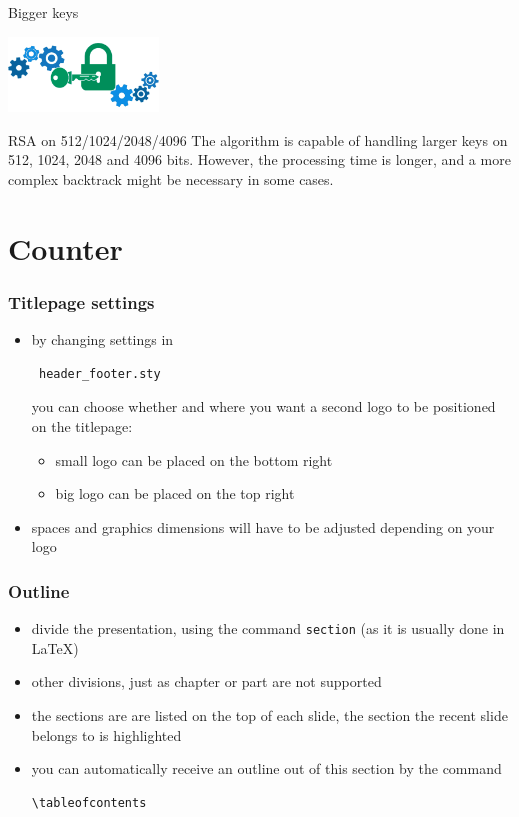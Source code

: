 \documentclass{beamer}
\begin{document}
\begin{frame}{Bigger keys}
  \begin{center}
    \includegraphics[width=4cm]{./graphics/key}
  \end{center}
  \begin{block}{RSA on 512/1024/2048/4096}
		The algorithm is capable of handling larger keys on 512, 1024, 2048 and 4096 bits.
    However, the processing time is longer, and a more complex backtrack might be necessary in some cases.
	\end{block}
\end{frame}

\section{Counter}

\begin{frame}[fragile]
\frametitle{Titlepage settings}
\begin{itemize}
\item by changing settings in \begin{verbatim} header_footer.sty \end{verbatim} you can choose whether and where you want a second logo to be positioned on the titlepage:
\begin{itemize}
\item small logo can be placed on the bottom right
\item big logo can be placed on the top right
\end{itemize}
\item spaces and graphics dimensions will have to be adjusted depending on your logo
\end{itemize}
\end{frame}

\begin{frame}[fragile]
\frametitle{Outline}
\begin{itemize}
\item divide the presentation, using the command {\tt section}
(as it is usually done in \LaTeX)
\item other divisions, just as chapter or part are not supported
\item the sections are are listed on the top of each slide, the section the
recent slide belongs to is highlighted
\item you can automatically receive an outline out of this section by the command
\begin{verbatim}
\tableofcontents
\end{verbatim}
\end{itemize}
\end{frame}
\end{document}
